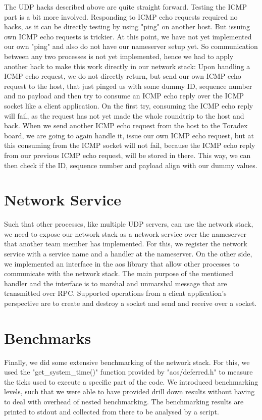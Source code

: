 The UDP hacks described above are quite straight forward. Testing the ICMP part
is a bit more involved. Responding to ICMP echo requests required no hacks, as
it can be directly testing by using "ping" on another host.  But issuing own
ICMP echo requests is trickier. At this point, we have not yet implemented our
own "ping" and also do not have our nameserver setup yet. So communication
between any two processes is not yet implemented, hence we had to apply another
hack to make this work directly in our network stack: Upon handling a ICMP echo
request, we do not directly return, but send our own ICMP echo request to the
host, that just pinged us with some dummy ID, sequence number and no payload and
then try to consume an ICMP echo reply over the ICMP socket like a client
application. On the first try, consuming the ICMP echo reply will fail, as the
request has not yet made the whole roundtrip to the host and back. When we send
another ICMP echo request from the host to the Toradex board, we are going to
again handle it, issue our own ICMP echo request, but at this consuming from the
ICMP socket will not fail, because the ICMP echo reply from our previous ICMP
echo request, will be stored in there. This way, we can then check if the ID,
sequence number and payload align with our dummy values.

\section{Network Service}

Such that other processes, like multiple UDP servers, can use the network stack,
we need to expose our network stack as a network service over the nameserver
that another team member has implemented.  For this, we register the network
service with a service name and a handler at the nameserver. On the other side,
we implemented an interface in the aos library that allow other processes to
communicate with the network stack. The main purpose of the mentioned handler
and the interface is to marshal and unmarshal message that are transmitted over
RPC.  Supported operations from a client application's perspective are to create
and destroy a socket and send and receive over a socket.

\section{Benchmarks}

Finally, we did some extensive benchmarking of the network stack. For this, we
used the "get\_system\_time()" function provided by "aos/deferred.h" to measure
the ticks used to execute a specific part of the code. We introduced
benchmarking levels, such that we were able to have provided drill down results
without having to deal with overhead of nested benchmarking.  The benchmarking
results are printed to stdout and collected from there to be analysed by a
script.

